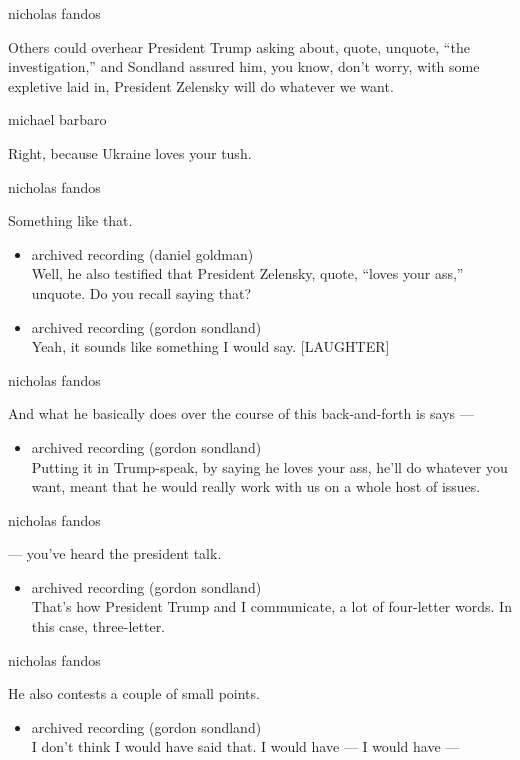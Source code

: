 nicholas fandos

Others could overhear President Trump asking about, quote, unquote,
``the investigation,'' and Sondland assured him, you know, don't worry,
with some expletive laid in, President Zelensky will do whatever we
want.

michael barbaro

Right, because Ukraine loves your tush.

nicholas fandos

Something like that.

\begin{itemize}
\item
  archived recording (daniel goldman)\\
  Well, he also testified that President Zelensky, quote, ``loves your
  ass,'' unquote. Do you recall saying that?
\item
  archived recording (gordon sondland)\\
  Yeah, it sounds like something I would say. {[}LAUGHTER{]}
\end{itemize}

nicholas fandos

And what he basically does over the course of this back-and-forth is
says ---

\begin{itemize}
\tightlist
\item
  archived recording (gordon sondland)\\
  Putting it in Trump-speak, by saying he loves your ass, he'll do
  whatever you want, meant that he would really work with us on a whole
  host of issues.
\end{itemize}

nicholas fandos

--- you've heard the president talk.

\begin{itemize}
\tightlist
\item
  archived recording (gordon sondland)\\
  That's how President Trump and I communicate, a lot of four-letter
  words. In this case, three-letter.
\end{itemize}

nicholas fandos

He also contests a couple of small points.

\begin{itemize}
\tightlist
\item
  archived recording (gordon sondland)\\
  I don't think I would have said that. I would have --- I would have
  ---
\end{itemize}

